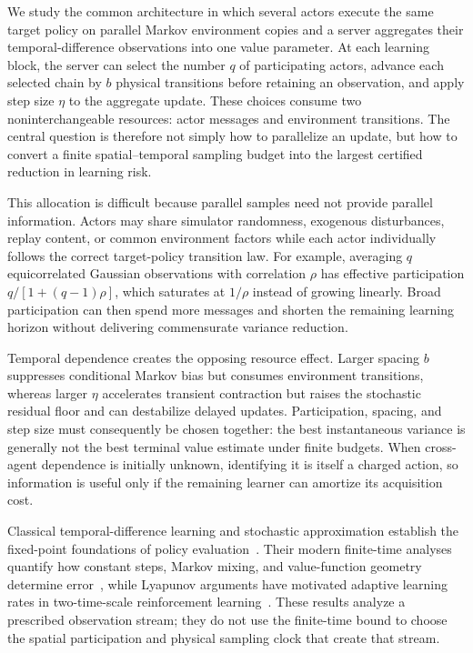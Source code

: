 \documentclass[journal]{IEEEtran}
\begin{document}
We study the common architecture in which several actors execute the same target policy on parallel Markov environment copies and a server aggregates their temporal-difference observations into one value parameter.
At each learning block, the server can select the number $q$ of participating actors, advance each selected chain by $b$ physical transitions before retaining an observation, and apply step size $\eta$ to the aggregate update.
These choices consume two noninterchangeable resources: actor messages and environment transitions.
The central question is therefore not simply how to parallelize an update, but how to convert a finite spatial--temporal sampling budget into the largest certified reduction in learning risk.

This allocation is difficult because parallel samples need not provide parallel information.
Actors may share simulator randomness, exogenous disturbances, replay content, or common environment factors while each actor individually follows the correct target-policy transition law.
For example, averaging $q$ equicorrelated Gaussian observations with correlation $\rho$ has effective participation $q/[1+(q-1)\rho]$, which saturates at $1/\rho$ instead of growing linearly.
Broad participation can then spend more messages and shorten the remaining learning horizon without delivering commensurate variance reduction.

Temporal dependence creates the opposing resource effect.
Larger spacing $b$ suppresses conditional Markov bias but consumes environment transitions, whereas larger $\eta$ accelerates transient contraction but raises the stochastic residual floor and can destabilize delayed updates.
Participation, spacing, and step size must consequently be chosen together: the best instantaneous variance is generally not the best terminal value estimate under finite budgets.
When cross-agent dependence is initially unknown, identifying it is itself a charged action, so information is useful only if the remaining learner can amortize its acquisition cost.

Classical temporal-difference learning and stochastic approximation establish the fixed-point foundations of policy evaluation~\cite{sutton1988td,tsitsiklis1997td,robbins1951stochastic,polyak1992averaging}.
Their modern finite-time analyses quantify how constant steps, Markov mixing, and value-function geometry determine error~\cite{bhandari2018finite,srikant2019finite,mou2022optimal,paulin2015concentration}, while Lyapunov arguments have motivated adaptive learning rates in two-time-scale reinforcement learning~\cite{gupta2019adaptive}.
These results analyze a prescribed observation stream; they do not use the finite-time bound to choose the spatial participation and physical sampling clock that create that stream.
\end{document}
